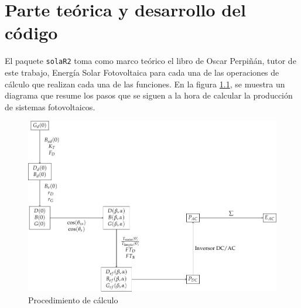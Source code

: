 \chapter{Parte teórica y desarrollo del código}
El paquete \texttt{solaR2} toma como marco teórico el libro de Oscar Perpiñán, tutor de este trabajo, Energía Solar Fotovoltaica \cite{Perpinan2023} para cada una de las operaciones de cálculo que realizan cada una de las funciones.
En la figura \ref{fig:orgd529198}, se muestra un diagrama que resume los pasos que se siguen a la hora de calcular la producción de sistemas fotovoltaicos.
\begin{figure}[t]
\centering
\includegraphics[scale=0.6]{figuras/ProcedimientoCalculoRadiacionInclinada.pdf}
\caption{\label{fig:orgd529198}Procedimiento de cálculo}
\end{figure}

